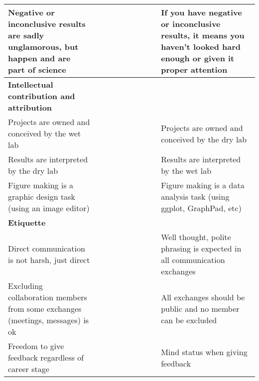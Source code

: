 \begin{table}[!ht]
\begin{adjustbox}{max width=\textwidth}
\begin{tabular}{|p{3in}|l|l|l|l|l|p{3in}|}
        Negative or inconclusive results are sadly unglamorous, but happen and are part of science & ~ & ~ & ~ & ~ & ~ & If you have negative or inconclusive results, it means you haven't looked hard enough or given it proper attention \\ \hline
        \textbf{Intellectual contribution and attribution} & ~ & ~ & ~ & ~ & ~ & ~ \\ \hline
        Projects are owned and conceived by the wet lab & ~ & ~ & ~ & ~ & ~ & Projects are owned and conceived by the dry lab \\ \hline
        Results are interpreted by the dry lab & ~ & ~ & ~ & ~ & ~ & Results are interpreted by the wet lab \\ \hline
        Figure making is a graphic design task (using an image editor) & ~ & ~ & ~ & ~ & ~ & Figure making is a data analysis task (using ggplot, GraphPad, etc) \\ \hline
        \textbf{Etiquette} & ~ & ~ & ~ & ~ & ~ & ~ \\ \hline
        Direct communication is not harsh, just direct & ~ & ~ & ~ & ~ & ~ & Well thought, polite phrasing is expected in all communication exchanges \\ \hline
        Excluding collaboration members from some exchanges (meetings, messages) is ok & ~ & ~ & ~ & ~ & ~ & All exchanges should be public and no member can be excluded \\ \hline
        Freedom to give feedback regardless of career stage & ~ & ~ & ~ & ~ & ~ & Mind status when giving feedback \\ \hline
    \end{tabular}

    \end{adjustbox}
\end{table}